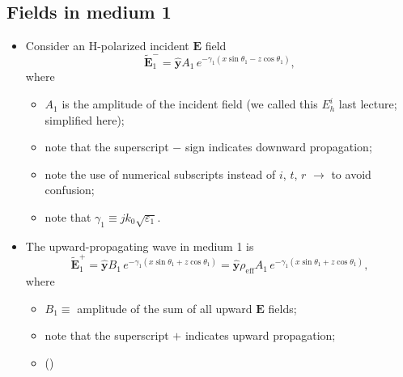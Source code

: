 \documentclass[11pt, oneside]{article}
\begin{document}
\subsection{Fields in medium 1}

\begin{itemize}
	\item Consider an H-polarized incident $\mathbf{E}$ field
	\begin{equation}
		\label{e:E1m}
		\tilde{\mathbf{E}}_1^- = \hat{\mathbf{y}}A_1\,e^{-\gamma_1(x\sin\theta_1 - z\cos\theta_1)},
	\end{equation}
	where
	\begin{itemize}
		\item $A_1$ is the amplitude of the incident field (we called this $E_h^i$ last lecture; simplified here);
		\item note that the superscript $-$ sign indicates downward propagation;
		\item note the use of numerical subscripts instead of $i$, $t$, $r$ $\rightarrow$ to avoid confusion;
		\item note that $\gamma_1 \equiv jk_0\sqrt{\varepsilon_1}$.
	\end{itemize}
	\item The upward-propagating wave in medium 1 is
	\begin{equation}
		\label{e:E1p}
		\tilde{\mathbf{E}}_1^+ = \hat{\mathbf{y}}B_1\,e^{-\gamma_1(x\sin\theta_1 + z\cos\theta_1)} = \hat{\mathbf{y}}\rho_\mathrm{eff} A_1\,e^{-\gamma_1(x\sin\theta_1 + z\cos\theta_1)},
	\end{equation}
	where
	\begin{itemize}
		\item $B_1 \equiv$ amplitude of the sum of all upward $\mathbf{E}$ fields;
		\item note that the superscript $+$ indicates upward propagation;
		\item[]  \label{e:rho_def}\hfill(\theequation)

\end{itemize}
\end{itemize}
\end{document}
